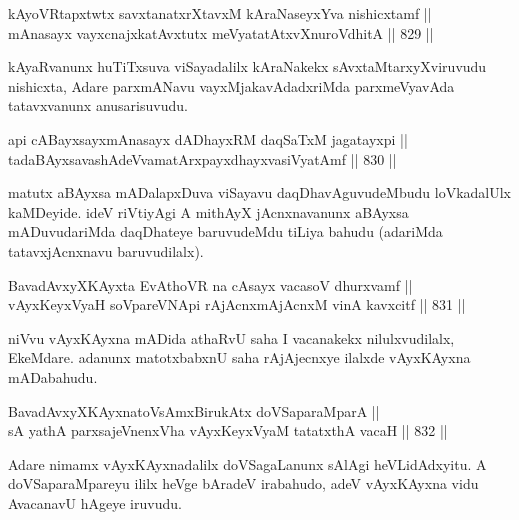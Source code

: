\begin{shl}
kAyoVRtapxtwtx savxtanatxrXtavxM kAraNaseyxYva nishicxtamf || \\
mAnasayx vayxcnajxkatAvxtutx meVyatatAtxvXnuroVdhitA \hfill || 829 ||  
\end{shl}

\begin{artha}
kAyaRvanunx huTiTxsuva viSayadalilx kAraNakekx sAvxtaMtarxyXviruvudu nishicxta, Adare parxmANavu vayxMjakavAdadxriMda parxmeVyavAda tatavxvanunx anusarisuvudu.
\end{artha}

\begin{shl}
api cABayxsayxmAnasayx dADhayxRM daqSaTxM jagatayxpi || \\
tadaBAyxsavashAdeVvamatArxpayxdhayxvasiVyatAmf \hfill || 830 ||  
\end{shl}

\begin{artha}
matutx aBAyxsa mADalapxDuva viSayavu daqDhavAguvudeMbudu loVkadalUlx kaMDeyide. ideV riVtiyAgi A mithAyX jAcnxnavanunx aBAyxsa mADuvudariMda daqDhateye baruvudeMdu tiLiya bahudu (adariMda tatavxjAcnxnavu baruvudilalx).
\end{artha}

\begin{shl}
BavadAvxyXKAyxta EvAthoVR na cAsayx vacasoV dhurxvamf || \\
vAyxKeyxVyaH soV\s pareVNApi rAjAcnxmAjAcnxM vinA kavxcitf \hfill || 831 ||  
\end{shl}
				
\begin{artha}
niVvu vAyxKAyxna mADida athaRvU saha I vacanakekx nilulxvudilalx, EkeMdare. adanunx matotxbabxnU  saha rAjAjecnxye ilalxde vAyxKAyxna mADabahudu.
\end{artha}

\begin{shl}
BavadAvxyXKAyxnatoV\s sAmxBirukAtx doVSaparaMparA || \\
sA yathA parxsajeVnenxVha vAyxKeyxVyaM tatatxthA vacaH \hfill || 832 ||  
\end{shl}

\begin{artha}
Adare nimamx vAyxKAyxnadalilx doVSagaLanunx sAlAgi heVLidAdxyitu. A doVSaparaMpareyu ililx heVge bAradeV irabahudo, adeV vAyxKAyxna vidu  AvacanavU hAgeye iruvudu.
\end{artha}



